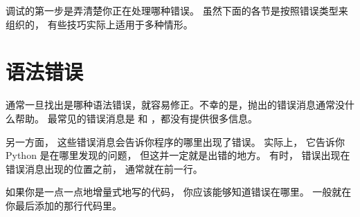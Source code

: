 
调试的第一步是弄清楚你正在处理哪种错误。  虽然下面的各节是按照错误类型来组织的， 有些技巧实际上适用于多种情形。

\section{语法错误}


通常一旦找出是哪种语法错误，就容易修正。不幸的是，抛出的错误消息通常没什么帮助。
最常见的错误消息是  和  ，都没有提供很多信息。


另一方面， 这些错误消息会告诉你程序的哪里出现了错误。  
实际上， 它告诉你 Python 是在哪里发现的问题， 但这并一定就是出错的地方。
有时， 错误出现在错误消息出现的位置之前， 通常就在前一行。


如果你是一点一点地增量式地写的代码， 你应该能够知道错误在哪里。  
一般就在你最后添加的那行代码里。



